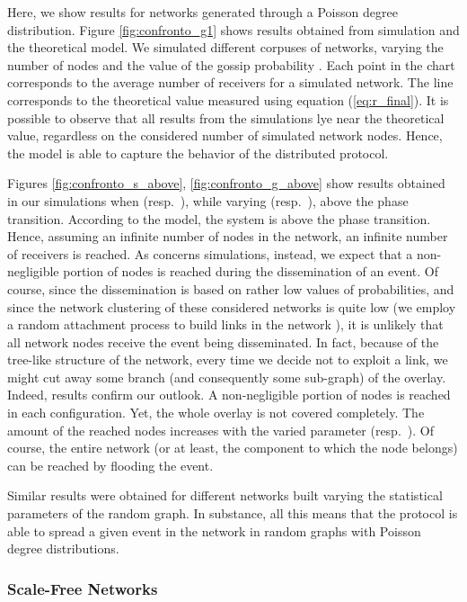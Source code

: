 \documentclass[10pt, conference, compsocconf]{IEEEtran}
\begin{document}
Here, we show results for networks generated through a Poisson degree distribution.
Figure \ref{fig:confronto_g1} shows results obtained from simulation and the theoretical model. We simulated different corpuses of networks, varying the number of nodes and the value of the gossip probability . 
Each point in the chart corresponds to the average number of receivers for a simulated network. The line corresponds to the theoretical value measured using equation (\ref{eq:r_final}). It is possible to observe that all results from the simulations lye near the theoretical value, regardless on the considered number of simulated network nodes. Hence, the model is able to capture the behavior of the distributed protocol.

Figures \ref{fig:confronto_s_above}, \ref{fig:confronto_g_above} show results obtained in our simulations when  (resp.~), while varying  (resp.~), above the phase transition. According to the model, the system is above the phase transition. Hence, assuming an infinite number of nodes in the network, an infinite number of receivers is reached. As concerns simulations, instead, we expect that a non-negligible portion of nodes is reached during the dissemination of an event. Of course, since the dissemination is based on rather low values of  probabilities, and since the network clustering of these considered networks is quite low (we employ a random attachment process to build links in the network \cite{newman03thestructure,newmanHandbook}),
it is unlikely that all network nodes receive the event being disseminated.
In fact, because of the tree-like structure of the network, every time we decide not to exploit a link, we might cut away some branch (and consequently some sub-graph) of the overlay.
Indeed, results confirm our outlook. 
A non-negligible portion of nodes is reached in each configuration. Yet, the whole overlay is not covered completely. The amount of the reached nodes increases with the varied parameter  (resp.~). Of course, the entire network (or at least, the component to which the node belongs) can be reached by flooding the event.

Similar results were obtained for different networks built varying the statistical parameters of the random graph. In substance, all this means that the protocol is able to spread a given event in the network in random graphs with Poisson degree distributions.

\subsubsection{Scale-Free Networks}
\end{document}
